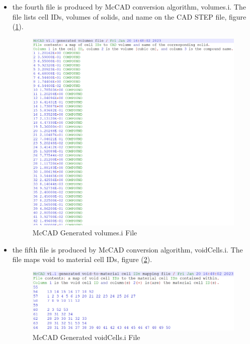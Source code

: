 \documentclass[12pt, a4paper, titlepage]{article}
\begin{document}
\begin{enumerate}
\begin{itemize}
	\item the fourth file is produced by McCAD conversion algorithm, volumes.i. The file lists cell IDs, volumes of solids, and name on the CAD STEP file, figure (\ref{fig:volumes file}).
	\begin{figure}[h!]
		\centering
		\includegraphics[scale=0.55]{figures/volumesFile.png}
		\caption{McCAD Generated volumes.i File}
		\label{fig:volumes file}
	\end{figure}

	\item the fifth file is produced by McCAD conversion algorithm, voidCells.i. The file maps void to material cell IDs, figure (\ref{fig:void cells file}).
	\begin{figure}[h!]
		\centering
		\includegraphics[scale=0.45]{figures/voidCellFile.png}
		\caption{McCAD Generated voidCells.i File}
		\label{fig:void cells file}
	\end{figure}
  \end{itemize}


\end{enumerate}
\end{document}
